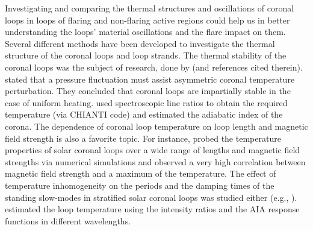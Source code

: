 \documentclass[oneside,onecolumn]{article}
\begin{document}
Investigating and comparing the thermal structures and oscillations of coronal loops in loops of flaring and non-flaring active regions could help us in better understanding the loops' material oscillations and the flare impact on them. Several different methods have been developed to investigate the thermal structure of the coronal loops and loop strands. The thermal stability of the coronal loops was the subject of research, done by \citet{ref:Habbal1979} (and references cited therein). \citet{ref:McClymont1985} stated that a pressure fluctuation must assist asymmetric coronal temperature perturbation. They concluded that coronal loops are impartially stable in the case of uniform heating. \citet{ref:VanDoorsselaere2011} used spectroscopic line ratios to obtain the required temperature (via CHIANTI code) and estimated the adiabatic index of the corona. The dependence of coronal loop temperature on loop length and magnetic field strength is also a favorite topic. For instance, \citet{ref:Dahlburg2018} probed the temperature properties of solar coronal loops over a wide range of lengths and magnetic field strengths via numerical simulations and observed a very high correlation between magnetic field strength and a maximum of the temperature. The effect of temperature inhomogeneity on the periods and the damping times of the standing slow-modes in stratified solar coronal loops was studied either (e.g., \citet{ref:Abedini2012}). \citet{ref:Fathalian2019} estimated the loop temperature using the intensity ratios and the AIA response functions in different wavelengths. 
\end{document}
